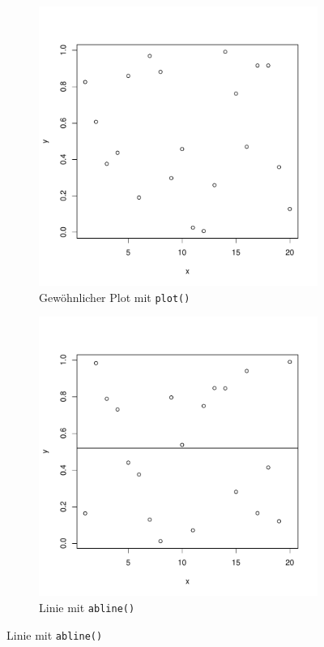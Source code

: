 \begin{figure}[h!]
\centering
\begin{subfigure}[b]{0.48\textwidth}
\includegraphics{r-cmd-023}
\caption{Gewöhnlicher Plot mit \lstinline{plot()}}
\end{subfigure}
\begin{subfigure}[b]{0.48\textwidth}
\includegraphics{r-cmd-024}
\caption{Linie mit \lstinline{abline()}}
\end{subfigure}


\end{figure}
